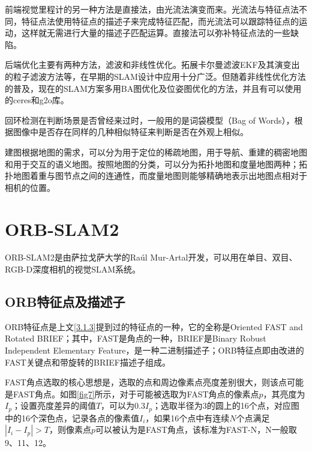 前端视觉里程计的另一种方法是直接法，由光流法演变而来。光流法与特征点法不同，特征点法使用特征点的描述子来完成特征匹配，而光流法可以跟踪特征点的运动，这样就无需进行大量的描述子匹配运算。直接法可以弥补特征点法的一些缺陷。


后端优化主要有两种方法，滤波和非线性优化。拓展卡尔曼滤波EKF及其演变出的粒子滤波方法等，在早期的SLAM设计中应用十分广泛。但随着非线性优化方法的普及，现在的SLAM方案多用BA图优化及位姿图优化的方法，并且有可以使用的ceres和g2o库。

回环检测在判断场景是否曾经来过时，一般用的是词袋模型（Bag of Words）\cite{zhang2010understanding}，根据图像中是否存在同样的几种相似特征来判断是否在外观上相似。

建图根据地图的需求，可以分为用于定位的稀疏地图，用于导航、重建的稠密地图和用于交互的语义地图。按照地图的分类，可以分为拓扑地图和度量地图两种；拓扑地图着重与图节点之间的连通性，而度量地图则能够精确地表示出地图点相对于相机的位置。




\section{ORB-SLAM2}

ORB-SLAM2是由萨拉戈萨大学的Raúl Mur-Artal开发，可以用在单目、双目、RGB-D深度相机的视觉SLAM系统。

\subsection{ORB特征点及描述子} \label{3.2.1}

ORB特征点是上文\ref{3.1.3}提到过的特征点的一种，它的全称是Oriented FAST and Rotated BRIEF；其中，FAST是角点的一种，BRIEF是Binary Robust Independent Elementary Feature，是一种二进制描述子；ORB特征点即由改进的FAST关键点和带旋转的BRIEF描述子组成。

FAST角点选取的核心思想是，选取的点和周边像素点亮度差别很大，则该点可能是FAST角点。如图\ref{fig7}所示，对于可能被选取为FAST角点的像素点$p$，其亮度为$I_p$；设置亮度差异的阈值$T$，可以为$0.3I_p$；选取半径为3的圆上的16个点，对应图中的16个深色点，记录各点的像素值$I_i$，如果16个点中有连续$N$个点满足$|I_i-I_p|>T$，则像素点$p$可以被认为是FAST角点，该标准为FAST-N，N一般取9、11、12\cite{Gao2017SLAM}。

